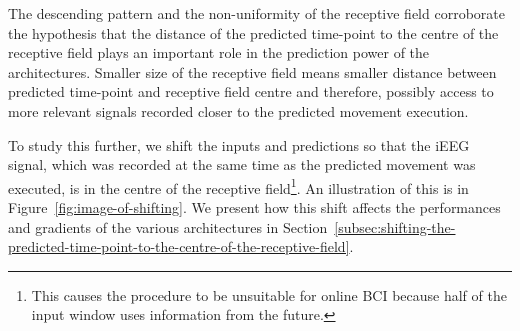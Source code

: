 The descending pattern and the non-uniformity of the receptive field corroborate the hypothesis that the distance of the predicted time-point to the centre of the receptive field plays an important role in the prediction power of the architectures.
Smaller size of the receptive field means smaller distance between predicted time-point and receptive field centre and therefore, possibly access to more relevant signals recorded closer to the predicted movement execution.

To study this further, we shift the inputs and predictions so that the iEEG signal, which was recorded at the same time as the predicted movement was executed, is in the centre of the receptive field\footnote{This causes the procedure to be unsuitable for online BCI because half of the input window uses information from the future.}. An illustration of this is in Figure~\ref{fig:image-of-shifting}. 
We present how this shift affects the performances and gradients of the various architectures in Section~\ref{subsec:shifting-the-predicted-time-point-to-the-centre-of-the-receptive-field}.


